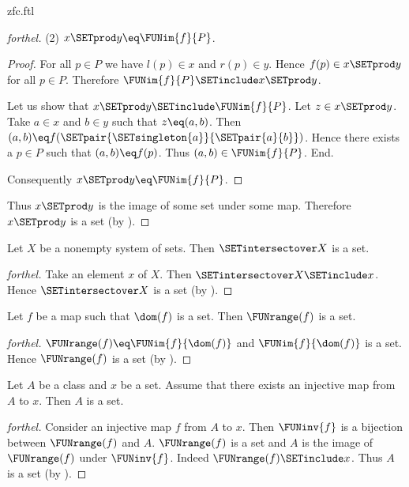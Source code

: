 \documentclass{naproche-library}
\begin{document}
\begin{smodule}[title=ZFC]{zfc.ftl}
\begin{proof}[forthel]
  (2) $x \SETprod y \eq \FUNim{f}{P}$.
  \begin{proof}
    For all $p \in P$ we have $l(p) \in x$ and $r(p) \in y$.
    Hence $f(p) \in x \SETprod y$ for all $p \in P$.
    Therefore $\FUNim{f}{P} \SETinclude x \SETprod y$.

    Let us show that $x \SETprod y \SETinclude \FUNim{f}{P}$.
      Let $z \in x \SETprod y$.
      Take $a \in x$ and $b \in y$ such that $z \eq (a,b)$.
      Then $(a,b) \eq f(\SETpair{\SETsingleton{a}}{\SETpair{a}{b}})$.
      Hence there exists a $p \in P$ such that $(a,b) \eq f(p)$.
      Thus $(a,b) \in \FUNim{f}{P}$.
    End.

    Consequently $x \SETprod y \eq \FUNim{f}{P}$.
  \end{proof}

  Thus $x \SETprod y$ is the image of some set under some map.
  Therefore $x \SETprod y$ is a set (by ).
\end{proof}

\begin{proposition}[forthel,id=FOUNDATIONS_10_5486815207227392]
  Let $X$ be a nonempty system of sets.
  Then $\SETintersectover X$ is a set.
\end{proposition}
\begin{proof}[forthel]
  Take an element $x$ of $X$.
  Then $\SETintersectover X \SETinclude x$.
  Hence $\SETintersectover X$ is a set (by ).
\end{proof}

\begin{proposition}[forthel,id=FOUNDATIONS_10_7598384349184000]
  Let $f$ be a map such that $\dom(f)$ is a set.
  Then $\FUNrange(f)$ is a set.
\end{proposition}
\begin{proof}[forthel]
  $\FUNrange(f) \eq \FUNim{f}{\dom(f)}$ and $\FUNim{f}{\dom(f)}$ is a set.
  Hence $\FUNrange(f)$ is a set (by ).
\end{proof}

\begin{proposition}[forthel,id=FOUNDATIONS_10_8631339572002816]
  Let $A$ be a class and $x$ be a set.
  Assume that there exists an injective map from $A$ to $x$.
  Then $A$ is a set.
\end{proposition}
\begin{proof}[forthel]
  Consider an injective map $f$ from $A$ to $x$.
  Then $\FUNinv{f}$ is a bijection between $\FUNrange(f)$ and $A$.
  $\FUNrange(f)$ is a set and $A$ is the image of $\FUNrange(f)$ under $\FUNinv{f}$.
  Indeed $\FUNrange(f) \SETinclude x$.
  Thus $A$ is a set (by ).
\end{proof}


\end{smodule}
\end{document}
